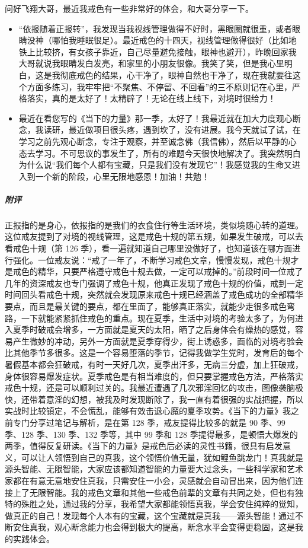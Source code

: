 \begin{case}
    问好飞翔大哥，最近我戒色有一些非常好的体会，和大哥分享一下。\begin{itemize}
        \item “依报随着正报转”，我发现当我视线管理做得不好时，黑眼圈就很重，或者眼睛没神（哪怕我睡眠很足）。最近戒色的十四天，视线管理做得很好（比如地铁上比较挤，有女孩子靠近，自己尽量避免接触，眼神也避开），昨晚回家我大哥就说我眼睛发白发亮，和家里的小朋友很像。我笑了笑，但是我心里明白，这是我彻底戒色的结果，心干净了，眼神自然也干净了，现在我就要往这个方面多练习，我牢牢把“不聚焦、不停留、不回看”的三不原则记在心里，严格落实，真的是太好了！太精辟了！无论在线上线下，对境时很给力！
        \item 最近在看您写的《当下的力量》那一季，太好了！我最近就在加大力度观心断念，我读研，最近做项目很头疼，遇到坎了，没有进展。我今天就试了试，在学习之前先观心断念，专注于观察，并至诚念佛（我信佛），然后以平静的心态去学习。不可思议的事发生了，所有的难题今天很快地解决了。我突然明白为什么说“我们每个人都有宝藏，只是我们没有发现它”！我感觉我的生命又进入到一个新的阶段，心里无限地感恩！加油！共勉！
    \end{itemize}
    \subparagraph{附评} 正报指的是身心，依报指的是我们的衣食住行等生活环境，类似境随心转的道理。这位戒友提到了对境的视线管理，这是戒色十规的第五规，如果发生破戒，可以去看戒色十规（第 126 季），看一遍就知道自己哪里没做好了，也知道该在哪方面进行强化。一位戒友说：“戒了一年了，不断学习戒色文章，慢慢发现，戒色十规才是戒色的精华，只要严格遵守戒色十规去做，一定可以戒掉的。”前段时间一位戒了几年的资深戒友也专门强调了戒色十规，他真正发现了戒色十规的价值，戒到一定时间回头看戒色十规，突然就会发现原来戒色十规已经涵盖了戒色成功的全部精华要点，而且是最关键的要点，都在里面了，能够真正落实，就能少走很多戒色弯路，一下就能紧紧抓住戒色的重点。现在夏季，生活中对境的考验太多了，为何进入夏季时破戒会增多，一方面就是夏天的太阳，晒了之后身体会有燥热的感觉，容易产生微妙的冲动，另外一方面就是夏季穿得少，街上诱惑多，面临的对境考验会比其他季节多很多。这是一个容易堕落的季节，记得我做学生党时，发育后的每个暑假基本都会狂破戒，有时一天好几次，夏季出汗多，无病三分虚，加上狂破戒，身体很容易爆发症状。夏季戒色是有相当难度的，但只要掌握戒色方法，严格落实戒色十规，还是可以顺利过关的。我最近遭遇了几次邪淫回忆的攻击，图像袭脑极快，还带着意淫的幻想，被我及时发现断除了，我一直有着很强的实战把握，所以实战时比较镇定，不会慌乱，能够有效击退心魔的夏季攻势。《当下的力量》我之前专门分享过笔记与解析，是在第 128 季，戒友提得比较多的就是 90 季、99 季、128 季、130 季、132 季等，其中 99 季和 128 季提得最多，是顿悟大爆发的两季，值得反复研读。《当下的力量》是戒色后必读的灵性书籍，很具有启发意义，可以让人领悟到自己的真我，这个领悟价值无量，犹如鲤鱼跳龙门！真我就是源头智能、无限智能，大家应该都知道智能的力量要大过念头，一些科学家和艺术家都在有意无意地安住真我，只需安住一小会，灵感就会自动冒出来，因为他们连接上了无限智能。我的戒色文章和其他一些戒色前辈的文章有共同之处，但也有独特的殊胜之处，通过我的分享，我希望大家都能领悟真我，学会安住纯粹的觉知，做真正的自己！发现每个人本有的宝藏，这个宝藏就是真我——源头智能！通过不断安住真我，观心断念能力也会得到极大的提高，断念水平会变得更稳固，这是我的实践体会。
\end{case}

